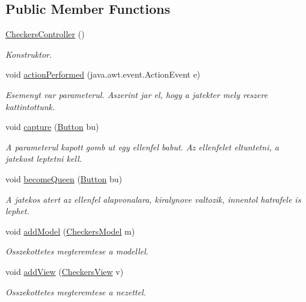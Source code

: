 \subsection*{Public Member Functions}
\begin{DoxyCompactItemize}
\item 
\hypertarget{classcontroller_1_1_checkers_controller_aea41f08d7c97c8b62a4758ca68e9b5eb}{}\hyperlink{classcontroller_1_1_checkers_controller_aea41f08d7c97c8b62a4758ca68e9b5eb}{Checkers\+Controller} ()\label{classcontroller_1_1_checkers_controller_aea41f08d7c97c8b62a4758ca68e9b5eb}

\begin{DoxyCompactList}\small\item\em Konstruktor. \end{DoxyCompactList}\item 
void \hyperlink{classcontroller_1_1_checkers_controller_a4c010cb052e90666cc44bea483f135a3}{action\+Performed} (java.\+awt.\+event.\+Action\+Event e)
\begin{DoxyCompactList}\small\item\em Esemenyt var parameterul. Aszerint jar el, hogy a jatekter mely reszere kattintottunk. \end{DoxyCompactList}\item 
void \hyperlink{classcontroller_1_1_checkers_controller_ab93b5e14e8fb548059fe78dd90722717}{capture} (\hyperlink{classview_1_1_button}{Button} bu)
\begin{DoxyCompactList}\small\item\em A parameterul kapott gomb ut egy ellenfel babut. Az ellenfelet eltuntetni, a jatekost leptetni kell. \end{DoxyCompactList}\item 
void \hyperlink{classcontroller_1_1_checkers_controller_a5ccd4ef2422c2e730ae8dcee65e67837}{become\+Queen} (\hyperlink{classview_1_1_button}{Button} bu)
\begin{DoxyCompactList}\small\item\em A jatekos atert az ellenfel alapvonalara, kiralynove valtozik, innentol hatrafele is lephet. \end{DoxyCompactList}\item 
void \hyperlink{classcontroller_1_1_checkers_controller_a285e632cf4e9f9e1775e406fcfe8d1f9}{add\+Model} (\hyperlink{classmodel_1_1_checkers_model}{Checkers\+Model} m)
\begin{DoxyCompactList}\small\item\em Osszekottetes megteremtese a modellel. \end{DoxyCompactList}\item 
void \hyperlink{classcontroller_1_1_checkers_controller_a4682a3b99c443dbad6662b1795cde1b9}{add\+View} (\hyperlink{classview_1_1_checkers_view}{Checkers\+View} v)
\begin{DoxyCompactList}\small\item\em Osszekottetes megteremtese a nezettel. \end{DoxyCompactList}\end{DoxyCompactItemize}


